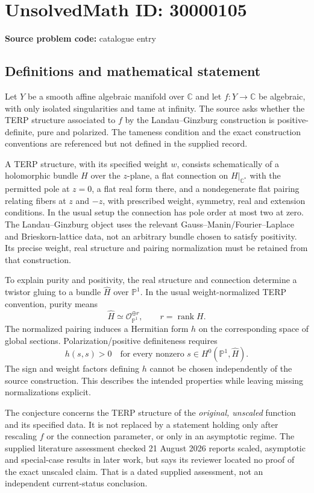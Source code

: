 \documentclass[11pt]{article}
\newcommand{\C}{\mathbb{C}}
\newcommand{\PP}{\mathbb{P}}
\begin{document}
\section*{UnsolvedMath ID: 30000105}
\textbf{Source problem code:} catalogue entry
\subsection{Definitions and mathematical statement}
Let $Y$ be a smooth affine algebraic manifold over $\C$ and let $f:Y\to\C$ be algebraic, with only isolated singularities and tame at infinity. The source asks whether the TERP structure associated to $f$ by the Landau--Ginzburg construction is positive-definite, pure and polarized. The tameness condition and the exact construction conventions are referenced but not defined in the supplied record.

A TERP structure, with its specified weight $w$, consists schematically of a holomorphic bundle $H$ over the $z$-plane, a flat connection on $H|_{\C^*}$ with the permitted pole at $z=0$, a flat real form there, and a nondegenerate flat pairing relating fibers at $z$ and $-z$, with prescribed weight, symmetry, real and extension conditions. In the usual setup the connection has pole order at most two at zero. The Landau--Ginzburg object uses the relevant Gauss--Manin/Fourier--Laplace and Brieskorn-lattice data, not an arbitrary bundle chosen to satisfy positivity. Its precise weight, real structure and pairing normalization must be retained from that construction.

To explain purity and positivity, the real structure and connection determine a twistor gluing to a bundle $\widehat H$ over $\PP^1$. In the usual weight-normalized TERP convention, purity means
\[
 \widehat H\simeq\mathcal O_{\PP^1}^{\oplus r},\qquad r=\operatorname{rank}H.
\]
The normalized pairing induces a Hermitian form $h$ on the corresponding space of global sections. Polarization/positive definiteness requires
\[
 h(s,s)>0\quad\text{for every nonzero }s\in H^0(\PP^1,\widehat H).
\]
The sign and weight factors defining $h$ cannot be chosen independently of the source construction. This describes the intended properties while leaving missing normalizations explicit.

The conjecture concerns the TERP structure of the \emph{original, unscaled} function and its specified data. It is not replaced by a statement holding only after rescaling $f$ or the connection parameter, or only in an asymptotic regime. The supplied literature assessment checked 21 August 2026 reports scaled, asymptotic and special-case results in later work, but says its reviewer located no proof of the exact unscaled claim. That is a dated supplied assessment, not an independent current-status conclusion.
\end{document}
